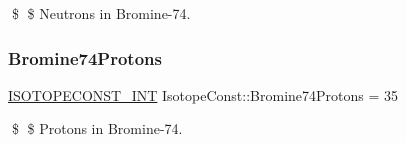 \$ \$ Neutrons in Bromine-\/74. \mbox{\label{group___isotope_const-_bromine-_br74_ga517f4f7309e7de9d6a05d91de67c63c8}} 
\subsubsection{\texorpdfstring{Bromine74\+Protons}{Bromine74Protons}}
{\footnotesize\ttfamily \mbox{\hyperlink{group___isotope_const-_macros_ga5f18360b3e99483a35c32d789e62621c}{I\+S\+O\+T\+O\+P\+E\+C\+O\+N\+S\+T\+\_\+\+I\+NT}} Isotope\+Const\+::\+Bromine74\+Protons = 35}

\$ \$ Protons in Bromine-\/74. 